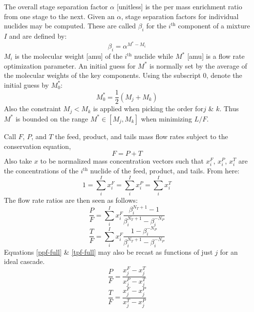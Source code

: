 \documentclass{ansconf}
\newcommand{\ith}[0]{$i^{\mbox{th}}$ }
\begin{document}
The overall stage separation factor $\alpha$ [unitless] is the per mass 
enrichment ratio from one stage to the next.  Given an $\alpha$,
stage separation factors for individual nuclides may be computed. 
These are called $\beta_i$ for the \ith component of a mixture $I$ and are 
defined by:
\begin{equation}
\beta_i = \alpha^{M^* - M_i}
\label{beta_i}
\end{equation}
$M_i$ is the molecular weight [amu] of the \ith
nuclide while $M^*$ [amu] is a flow rate optimization parameter.  An initial
guess for 
$M^*$ is normally set by the average of the molecular weights of the key components. 
Using the subscript $0$, denote the initial guess by $M_0^*$:
\begin{equation}
M_0^* = \frac{1}{2}\left(M_j + M_k\right)
\label{mstar-guess}
\end{equation}
Also the constraint $M_j < M_k$ is applied when picking the order for$j$ \& $k$.
Thus $M^*$ is bounded on the range $M^*\in[M_j,M_k]$ when minimizing $L/F$.

Call $F$, $P$, and $T$ the feed, product, and tails mass flow rates subject to 
the conservation equation,
\begin{equation}
F = P + T
\label{total-flow-constraint}
\end{equation}
Also take $x$ to be normalized mass concentration vectors such that $x_i^F$, 
$x_i^P$, $x_i^T$ are the concentrations of the \ith nuclide of the feed, product,
and tails.  From here:
\begin{equation}
1 = \sum_i^I x_i^F = \sum_i^I x_i^P = \sum_i^I x_i^T 
\end{equation}
The flow rate ratios are then seen as follows:
\begin{equation}
\frac{P}{F} = \sum_i^I x_i^F\frac{\beta_i^{N_T+1} - 1}
                                 {\beta_i^{N_T+1} - \beta_i^{-N_P}}
\label{ppf-full}
\end{equation}
\begin{equation}
\frac{T}{F} = \sum_i^I x_i^F\frac{1 - \beta_i^{-N_P}}
                                 {\beta_i^{N_T+1} - \beta_i^{-N_P}}
\label{tpf-full}
\end{equation}
Equations \ref{ppf-full} \&  \ref{tpf-full} may also be recast as functions
of just $j$ for an ideal cascade.
\begin{equation}
\frac{P}{F} = \frac{x_j^F - x_j^T}{x_j^P - x_j^T}
\label{ppf-key}
\end{equation}
\begin{equation}
\frac{T}{F} = \frac{x_j^F - x_j^P}{x_j^T - x_j^P}
\label{tpf-key}
\end{equation}
\end{document}
